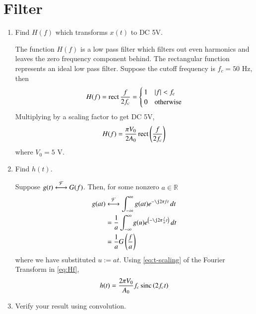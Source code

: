 \documentclass[journal,12pt,twocolumn]{IEEEtran}
\renewcommand\thesection{\arabic{section}}
\begin{document}
\section{Filter}
\begin{enumerate}[label=\thesection.\arabic*
,ref=\thesection.\theenumi]
\item Find $H(f)$ which transforms $x(t)$ to DC 5V.

\solution The function $H(f)$ is a low pass filter which filters out
even harmonics and leaves the zero frequency component behind.
The rectangular function represents an ideal low pass filter. 
Suppose the cutoff frequency is $f_c = 50$ Hz, then
\begin{align}
    H(f) = \mathop{\mathrm{rect}}{\frac{f}{2f_c}} =
    \begin{cases}
        1 & \left\vert f\right\vert < f_c \\
        0 & \textrm{otherwise}
    \end{cases}
    \label{eq:Hf}
\end{align}
Multiplying by a scaling factor to get DC 5V,
\begin{align}
    H(f) = \frac{\pi V_0}{2A_0}\mathop{\mathrm{rect}}{\left(\frac{f}{2f_c}\right)}
\end{align}
where $V_0 = 5$ V.
\item Find $h(t)$.

\solution Suppose $g(t)\overset{\mathcal{F}}{ \longleftrightarrow}G(f)$. Then, for some
nonzero $a \in \mathbb{R}$
\begin{align}
    g(at)&\system{F}\int_{-\infty}^{\infty}g(at)e^{-\j2\pi ft}\, dt \\
         &=\frac{1}{a}\int_{-\infty}^{\infty}g(u)e^{\brak{-\j2\pi \frac{f}{a}t}}\, dt \\
         &=\frac{1}{a}G\brak{\frac{f}{a}}
         \label{eq:t-scaling}
\end{align}
where we have substituted $u := at$. Using 
\eqref{eq:t-scaling} of the Fourier Transform in \eqref{eq:Hf},
\begin{align}
    h(t) = \frac{2\pi V_0}{A_0}f_c\mathop{\mathrm{sinc}}\left(2f_ct\right)
\end{align}
\item Verify your result using convolution.


\end{enumerate}
\end{document}
